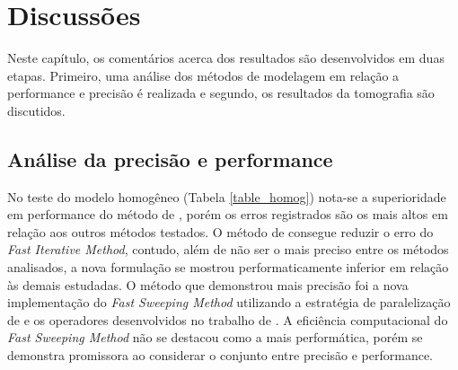 \chapter{Discussões}
\label{ch:discussoes}

 
Neste capítulo, os comentários acerca dos resultados são desenvolvidos em duas etapas. Primeiro, uma análise dos métodos de modelagem em relação a performance e precisão é realizada e segundo, os resultados da tomografia são discutidos.   
 
\section{Análise da precisão e performance} 

No teste do modelo homogêneo (Tabela \ref{table_homog}) nota-se a superioridade em performance do método de , porém os erros registrados são os mais altos em relação aos outros métodos testados. O método de  consegue reduzir o erro do \textit{Fast Iterative Method}, contudo, além de não ser o mais preciso entre os métodos analisados, a nova formulação se mostrou performaticamente inferior em relação às demais estudadas. O método que demonstrou mais precisão foi a nova implementação do \textit{Fast Sweeping Method} utilizando a estratégia de paralelização de  e os operadores desenvolvidos no trabalho de . A eficiência computacional do \textit{Fast Sweeping Method} não se destacou como a mais performática, porém se demonstra promissora ao considerar o conjunto entre precisão e performance.  

